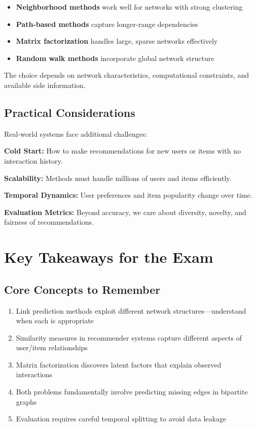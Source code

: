 \documentclass[11pt,a4paper]{article}
\begin{document}
\begin{itemize}
\item \textbf{Neighborhood methods} work well for networks with strong clustering
\item \textbf{Path-based methods} capture longer-range dependencies
\item \textbf{Matrix factorization} handles large, sparse networks effectively
\item \textbf{Random walk methods} incorporate global network structure
\end{itemize}

The choice depends on network characteristics, computational constraints, and available side information.

\subsection{Practical Considerations}
Real-world systems face additional challenges:

\textbf{Cold Start:} How to make recommendations for new users or items with no interaction history.

\textbf{Scalability:} Methods must handle millions of users and items efficiently.

\textbf{Temporal Dynamics:} User preferences and item popularity change over time.

\textbf{Evaluation Metrics:} Beyond accuracy, we care about diversity, novelty, and fairness of recommendations.

\section{Key Takeaways for the Exam}

\subsection{Core Concepts to Remember}
\begin{enumerate}
\item Link prediction methods exploit different network structures—understand when each is appropriate
\item Similarity measures in recommender systems capture different aspects of user/item relationships
\item Matrix factorization discovers latent factors that explain observed interactions
\item Both problems fundamentally involve predicting missing edges in bipartite graphs
\item Evaluation requires careful temporal splitting to avoid data leakage
\end{enumerate}
\end{document}
